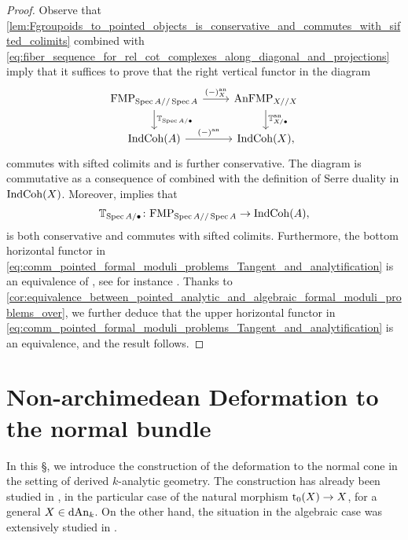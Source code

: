 \documentclass[10pt,a4paper,reqno]{amsart} %
\theoremstyle{plain}
\theoremstyle{definition}
\theoremstyle{remark}
\numberwithin{equation}{section}
\begin{document}
\begin{proof}
    Observe that
    \cref{lem:Fgroupoids_to_pointed_objects_is_conservative_and_commutes_with_sifted_colimits} combined with
    \eqref{eq:fiber_sequence_for_rel_cot_complexes_along_diagonal_and_projections} imply that it suffices to prove that
    the right vertical functor in the diagram
        \begin{equation} \label{eq:comm_pointed_formal_moduli_problems_Tangent_and_analytification}
        \begin{tikzcd}
            \mathrm{FMP}_{\Spec A/ / \Spec A} \ar{r}{(-)\an_X}\ar{d}{\bbT_{\Spec A/ \bullet}} & \anFMP_{X/ / X} \ar{d}{\bbT\an_{X/ \bullet}} \\
            \Ind\Coh(A) \ar{r}{(-)\an} & \Ind\Coh(X),
        \end{tikzcd}
        \end{equation}
    commutes with sifted colimits and is further conservative. The diagram is commutative as a consequence of \cite[Lemma 6.9 (2)]{Porta_Yu_NQK}
    combined with the definition of Serre duality in $\mathrm{Ind}\mathrm{Coh}(X)$. Moreover, \cite[Corollary 4.31]{Antonio_Koszul} implies that
        \[
            \mathbb T_{\operatorname{Spec} A/ \bullet} \colon     \mathrm{FMP}_{\operatorname{Spec} A/ / \operatorname{Spec} A} \to \mathrm{Ind}\mathrm{Coh}(A),
        \]
    is both conservative and commutes with sifted colimits. Furthermore, the bottom horizontal functor in \eqref{eq:comm_pointed_formal_moduli_problems_Tangent_and_analytification}
    is an equivalence of \infcats, see for instance \cite[Theorem 4.5]{Porta_Yu_NQK}. Thanks to \cref{cor:equivalence_between_pointed_analytic_and_algebraic_formal_moduli_problems_over}, we further deduce
    that the upper horizontal functor in \eqref{eq:comm_pointed_formal_moduli_problems_Tangent_and_analytification} is an equivalence, and the result follows.
\end{proof}




\section{Non-archimedean Deformation to the normal bundle}

In this \S, we introduce the construction of the deformation to the normal cone in the setting of derived $k$-analytic geometry. The construction has
already been studied in \cite{Porta_Yu_NQK}, in the particular case of the natural morphism $\mathrm{t}_0(X) \to X$, for a general $X \in \mathrm{dAn}_k$.
On the other hand, the situation in the algebraic case was extensively studied in \cite{Gaitsgory_Study_II}.
\end{document}
